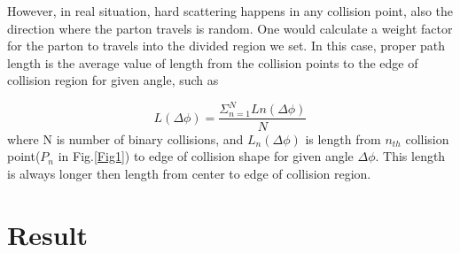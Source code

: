   
   However, in  real situation, hard scattering happens in any collision point, also the direction where the parton travels is random. One would calculate a weight factor for the parton to travels into the divided region we set. In this case, proper path length is the average value of length from the collision points to the edge of collision region for given angle, such as
   
 \begin{equation}
L(\Delta \phi)=\frac{\Sigma_{n=1}^{N}{Ln(\Delta \phi)}}{N}
\label{eq:pathlength}
\end{equation}
 where N is number of binary collisions, and $L_{n}(\Delta \phi)$ is length from $n_{th}$ collision point($P_n$ in Fig.\ref{Fig1}) to edge of collision shape for given angle $\Delta \phi$.  This length is always longer then length from center to edge of collision region.
 


\section{Result}

